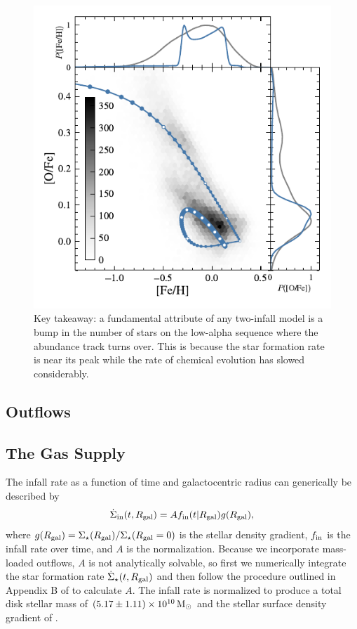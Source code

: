 \documentclass[twocolumn,twocolappendix,linenumbers]{aastex631}
\begin{document}
\begin{figure}
    \centering
    \includegraphics{figures/onezone_sfr.pdf}
    \caption{Key takeaway: a fundamental attribute of any two-infall model is a bump in the number of stars on the low-alpha sequence where the abundance track turns over. This is because the star formation rate is near its peak while the rate of chemical evolution has slowed considerably.}
    \label{fig:onezone-sfr}
\end{figure}

\subsection{Outflows}
\label{sec:outflows}

\subsection{The Gas Supply}
\label{sec:sfh}

The infall rate as a function of time and galactocentric radius can generically be described by
\begin{equation}
    \label{eq:infall-rate}
    \dot\Sigma_{\rm in}(t,R_{\rm gal}) = A f_{\rm in}(t|R_{\rm gal}) g(R_{\rm gal}),
\end{equation}
where $g(R_{\rm gal})=\Sigma_\star(R_{\rm gal}) / \Sigma_\star(R_{\rm gal}=0)$ is the stellar density gradient, $f_{\rm in}$ is the infall rate over time, and $A$ is the normalization. Because we incorporate mass-loaded outflows, $A$ is not analytically solvable, so first we numerically integrate the star formation rate $\dot\Sigma_\star(t,R_{\rm gal})$ and then follow the procedure outlined in Appendix B of \citet{johnson_stellar_2021} to calculate $A$. The infall rate is normalized to produce a total disk stellar mass of $(5.17\pm1.11)\times 10^{10}\,{\rm M}_\odot$ \citep{licquia_improved_2015} and the stellar surface density gradient of \citet{bland-hawthorn_galaxy_2016}.
\end{document}
